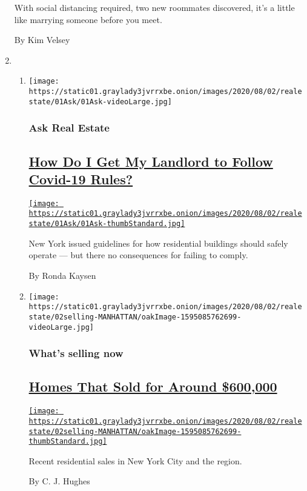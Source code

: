 \begin{enumerate}
  With social distancing required, two new roommates discovered, it's a
  little like marrying someone before you meet.

  By Kim Velsey
\item
  \begin{enumerate}
  \def\labelenumii{\arabic{enumii}.}
  \item
    \texttt{[image: https://static01.graylady3jvrrxbe.onion/images/2020/08/02/realestate/01Ask/01Ask-videoLarge.jpg]}

    \hypertarget{ask-real-estate}{%
    \subsubsection{Ask Real Estate}\label{ask-real-estate}}

    \hypertarget{how-do-i-get-my-landlord-to-follow-covid-19-rules}{%
    \subsection{\texorpdfstring{\href{/2020/08/01/realestate/coronavirus-covid-apartment-buildings.html}{How
    Do I Get My Landlord to Follow Covid-19
    Rules?}}{How Do I Get My Landlord to Follow Covid-19 Rules?}}\label{how-do-i-get-my-landlord-to-follow-covid-19-rules}}

    \href{/2020/08/01/realestate/coronavirus-covid-apartment-buildings.html}{\texttt{[image: https://static01.graylady3jvrrxbe.onion/images/2020/08/02/realestate/01Ask/01Ask-thumbStandard.jpg]}}

    New York issued guidelines for how residential buildings should
    safely operate --- but there no consequences for failing to comply.

    By Ronda Kaysen
  \item
    \texttt{[image: https://static01.graylady3jvrrxbe.onion/images/2020/08/02/realestate/02selling-MANHATTAN/oakImage-1595085762699-videoLarge.jpg]}

    \hypertarget{whats-selling-now}{%
    \subsubsection{What's selling now}\label{whats-selling-now}}

    \hypertarget{homes-that-sold-for-around-600000}{%
    \subsection{\texorpdfstring{\href{/2020/08/02/realestate/homes-that-sold-for-around-600000.html}{Homes
    That Sold for Around
    \$600,000}}{Homes That Sold for Around \$600,000}}\label{homes-that-sold-for-around-600000}}

    \href{/2020/08/02/realestate/homes-that-sold-for-around-600000.html}{\texttt{[image: https://static01.graylady3jvrrxbe.onion/images/2020/08/02/realestate/02selling-MANHATTAN/oakImage-1595085762699-thumbStandard.jpg]}}

    Recent residential sales in New York City and the region.

    By C. J. Hughes
  \end{enumerate}
\end{enumerate}

